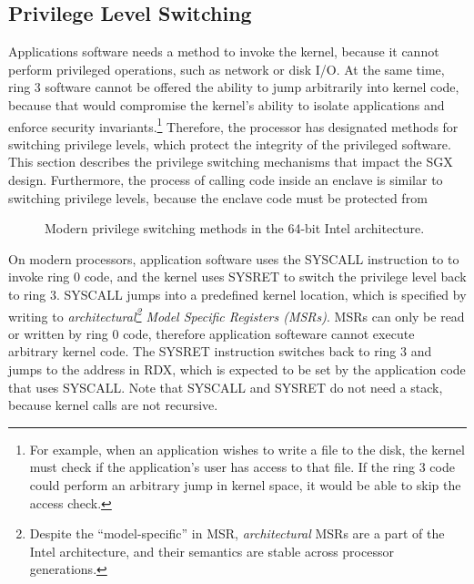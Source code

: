 \subsection{Privilege Level Switching}
\label{sec:faults}

Applications software needs a method to invoke the kernel, because it cannot
perform privileged operations, such as network or disk I/O. At the same time,
ring 3 software cannot be offered the ability to jump arbitrarily into kernel
code, because that would compromise the kernel's ability to isolate
applications and enforce security invariants.\footnote{For example, when an
application wishes to write a file to the disk, the kernel must check if the
application's user has access to that file. If the ring 3 code could perform an
arbitrary jump in kernel space, it would be able to skip the access check.}
Therefore, the processor has designated methods for switching privilege levels,
which protect the integrity of the privileged software. This section describes
the privilege switching mechanisms that impact the SGX design. Furthermore,
the process of calling code inside an enclave is similar to switching
privilege levels, because the enclave code must be protected from


\begin{figure}[hbt]
  \caption{
    Modern privilege switching methods in the 64-bit Intel architecture.
  }
  \label{fig:cpu_ring_switch}
\end{figure}

On modern processors, application software uses the SYSCALL instruction to
to invoke ring 0 code, and the kernel uses SYSRET to switch the privilege level
back to ring 3. SYSCALL jumps into a predefined kernel location, which is
specified by writing to \textit{architectural\footnote{Despite the
``model-specific'' in MSR, \textit{architectural} MSRs are a part of the Intel
architecture, and their semantics are stable across processor generations.}
Model Specific Registers (MSRs)}. MSRs can only be read or written by ring 0
code, therefore application softeware cannot execute arbitrary kernel code.
The SYSRET instruction switches back to ring 3 and jumps to the address in RDX,
which is expected to be set by the application code that uses SYSCALL. Note
that SYSCALL and SYSRET do not need a stack, because kernel calls are not
recursive.

